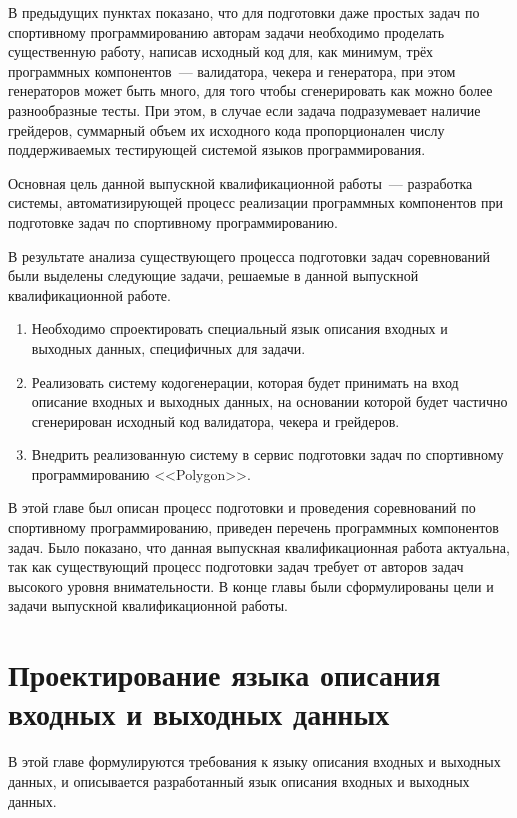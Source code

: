 \documentclass[times,specification,annotation]{style/itmo-student-thesis/itmo-student-thesis}
\begin{document}
В предыдущих пунктах показано, что для подготовки даже простых задач по спортивному программированию авторам задачи необходимо проделать существенную работу, написав исходный код для, как минимум, трёх программных компонентов~--- валидатора, чекера и генератора, при этом генераторов может быть много, для того чтобы сгенерировать как можно более разнообразные тесты. При этом, в случае если задача подразумевает наличие грейдеров, суммарный объем их исходного кода пропорционален числу поддерживаемых тестирующей системой языков программирования.


Основная цель данной выпускной квалификационной работы~--- разработка системы, автоматизирующей процесс реализации программных компонентов при подготовке задач по спортивному программированию.

В результате анализа существующего процесса подготовки задач соревнований были выделены следующие задачи, решаемые в данной выпускной квалификационной работе.

\begin{enumerate}[leftmargin=1.75cm]
    \item Необходимо спроектировать специальный язык описания входных и выходных данных, специфичных для задачи.
    \item Реализовать систему кодогенерации, которая будет принимать на вход описание входных и выходных данных, на основании которой будет частично сгенерирован исходный код валидатора, чекера и грейдеров.
    \item Внедрить реализованную систему в сервис подготовки задач по спортивному программированию <<Polygon>>.
\end{enumerate}

\chapterconclusion

В этой главе был описан процесс подготовки и проведения соревнований по спортивному программированию, приведен перечень программных компонентов задач. Было показано, что данная выпускная квалификационная работа актуальна, так как существующий процесс подготовки задач требует от авторов задач высокого уровня внимательности. В конце главы были сформулированы цели и задачи выпускной квалификационной работы.

\chapter{Проектирование языка описания входных и выходных данных}

В этой главе формулируются требования к языку описания входных и выходных данных, и описывается разработанный язык описания входных и выходных данных.
\end{document}
